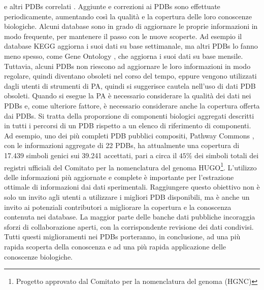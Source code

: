 e altri PDBs correlati \cite{ogata1999kegg}. Aggiunte e correzioni ai PDBs sono effettuate
periodicamente, aumentando così la qualità e la copertura delle loro conoscenze biologiche.
Alcuni database sono in grado di aggiornare le proprie informazioni in modo frequente, per mantenere il passo con le
nuove scoperte. Ad esempio il database KEGG \cite{kanehisa1997database} aggiorna i suoi dati su base settimanale, ma
altri PDBs lo fanno meno spesso, come Gene Ontology \cite{dolinski2000gene}, che aggiorna i suoi dati su base mensile.
Tuttavia, alcuni PDBs non riescono ad aggiornare le loro informazioni in modo regolare, quindi diventano
obsoleti nel corso del tempo, eppure vengono utilizzati dagli utenti di strumenti di PA, quindi si suggerisce 
cautela nell'uso di dati PDB obsoleti.
Quando si esegue la PA è necessario considerare la qualità dei dati nei PDBs e, come ulteriore fattore, è necessario
considerare anche la copertura offerta dai PDBs.
Si tratta della proporzione di componenti biologici aggregati descritti in tutti i percorsi di un PDB rispetto a 
un elenco di riferimento di componenti. 
Ad esempio, uno dei più completi PDB pubblici compositi, Pathway Commons \cite{cerami2010pathway}, con le informazioni
aggregate di 22 PDBs, ha attualmente una copertura di 17.439 simboli genici sui 39.241 accettati, pari a circa 
il $45\%$ dei simboli totali dei registri ufficiali del Comitato per la nomenclatura del genoma HUGO\footnote{
Progetto approvato dal Comitato per la nomenclatura del genoma (HGNC)}. L'utilizzo delle informazioni più aggiornate 
e complete è importante per l'estrazione ottimale di informazioni dai dati sperimentali. Raggiungere questo obiettivo
non è solo un invito agli utenti a utilizzare i migliori PDB disponibili, ma è anche un invito ai
potenziali contributori a migliorare la copertura e la conoscenza contenuta nei database. La maggior parte delle 
banche dati pubbliche incoraggia sforzi di collaborazione aperti, con la corrispondente revisione dei dati condivisi.
Tutti questi miglioramenti nei PDBs porteranno, in conclusione, ad una più rapida scoperta della conoscenza e
ad una più rapida applicazione delle conoscenze biologiche. 